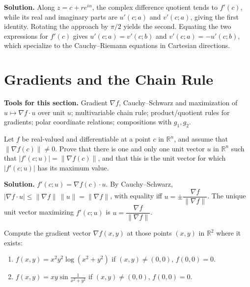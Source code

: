 \noindent\textbf{Solution.}
Along $z=c+re^{i\alpha}$, the complex difference quotient tends to $f'(c)$, while its real and imaginary parts are $u'(c;a)$ and $v'(c;a)$, giving the first identity. Rotating the approach by $\pi/2$ yields the second. Equating the two expressions for $f'(c)$ gives $u'(c;a)=v'(c;b)$ and $v'(c;a)=-u'(c;b)$, which specialize to the Cauchy–Riemann equations in Cartesian directions.


\section{Gradients and the Chain Rule}

\noindent\textbf{Tools for this section.} Gradient $\nabla f$, Cauchy–Schwarz and maximization of $u\mapsto \nabla f\cdot u$ over unit $u$; multivariable chain rule; product/quotient rules for gradients; polar coordinate relations; compositions with $g_1,g_2$.

\begin{problembox}
Let \( f \) be real-valued and differentiable at a point \( c \) in \( \mathbb{R}^n \), and assume that \( \| \nabla f(c) \| \neq 0 \). Prove that there is one and only one unit vector \( u \) in \( \mathbb{R}^n \) such that \( |f'(c; u)| = \| \nabla f(c) \| \), and that this is the unit vector for which \( |f'(c; u)| \) has its maximum value.
\end{problembox}

\noindent\textbf{Solution.}
$f'(c;u)=\nabla f(c)\cdot u$. By Cauchy–Schwarz, $|\nabla f\cdot u|\le\|\nabla f\|\,\|u\|=\|\nabla f\|$, with equality iff $u=\pm\dfrac{\nabla f}{\|\nabla f\|}$. The unique unit vector maximizing $f'(c;u)$ is $u=\dfrac{\nabla f}{\|\nabla f\|}$.

\begin{problembox}
Compute the gradient vector \( \nabla f(x, y) \) at those points \( (x, y) \) in \( \mathbb{R}^2 \) where it exists:
\begin{enumerate}[label=(\alph*)]
\item \( f(x, y) = x^2 y^2 \log (x^2 + y^2) \) if \( (x, y) \ne (0, 0) \), \( f(0, 0) = 0 \).
\item \( f(x, y) = xy \sin \frac{1}{x^2 + y^2} \) if \( (x, y) \ne (0, 0) \), \( f(0, 0) = 0 \).
\end{enumerate}
\end{problembox}


